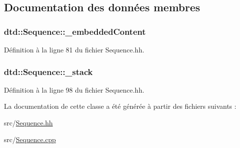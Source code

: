 \subsection{Documentation des données membres}
\hypertarget{classdtd_1_1_sequence_a36b690d5fe1490780c079cb65f9821f6}{
\subsubsection[{\_\-embeddedContent}]{ {\bf dtd::Sequence::\_\-embeddedContent}}}
\label{classdtd_1_1_sequence_a36b690d5fe1490780c079cb65f9821f6}


Définition à la ligne 81 du fichier Sequence.hh.

\hypertarget{classdtd_1_1_sequence_aa0d3d57604b1b62caeb0eb2c7b776169}{
\subsubsection[{\_\-stack}]{ {\bf dtd::Sequence::\_\-stack}}}
\label{classdtd_1_1_sequence_aa0d3d57604b1b62caeb0eb2c7b776169}


Définition à la ligne 98 du fichier Sequence.hh.



La documentation de cette classe a été générée à partir des fichiers suivants :\begin{DoxyCompactItemize}
\item 
src/\hyperlink{_sequence_8hh}{Sequence.hh}\item 
src/\hyperlink{_sequence_8cpp}{Sequence.cpp}\end{DoxyCompactItemize}
